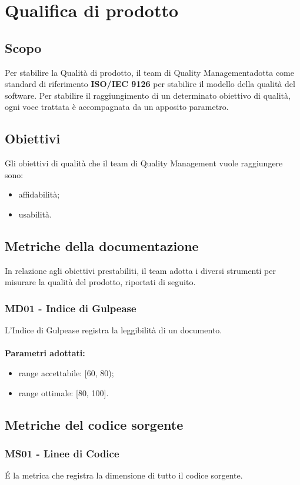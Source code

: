 \section{Qualifica di prodotto}
\subsection{Scopo}
Per stabilire la Qualità di prodotto, il team di Quality Management\glo adotta come standard di riferimento \textbf{ISO/IEC 9126} per stabilire il modello della qualità del software. Per stabilire il raggiungimento di un determinato obiettivo di qualità, ogni voce trattata è accompagnata da un apposito parametro.
\subsection{Obiettivi}
Gli obiettivi di qualità che il team di Quality Management vuole raggiungere sono:
\begin{itemize}
\item affidabilità;
\item usabilità.
\end{itemize}
\subsection{Metriche della documentazione}
In relazione agli obiettivi prestabiliti, il team adotta i diversi strumenti per misurare la qualità del prodotto, riportati di seguito.
\subsubsection{MD01 - Indice di Gulpease}
L'Indice di Gulpease registra la leggibilità di un documento. \\ \\ 
\textbf{Parametri adottati:} 
\begin{itemize}
\item range accettabile: [60, 80);
\item range ottimale: [80, 100].
\end{itemize}
\subsection{Metriche del codice sorgente}
\subsubsection{MS01 - Linee di Codice}
\'E la metrica che registra la dimensione di tutto il codice sorgente.

